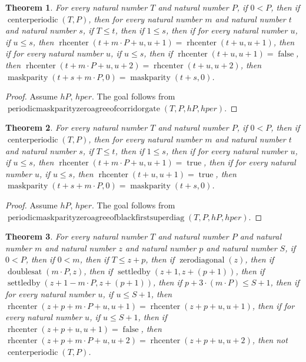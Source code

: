 \documentclass[11pt]{article}
\newtheorem{theorem}{Theorem}[section]
\theoremstyle{definition}
\begin{document}
\begin{theorem}
\label{ll:paper:periodic-maskparity-zero-agree-of-corridor-gate}
For every natural number \(T\) and natural number \(P\), if \(0 < P\), then if \(\operatorname{centerperiodic}(T, P)\), then for every natural number \(m\) and natural number \(t\) and natural number \(s\), if \(T \le t\), then if \(1 \le s\), then if for every natural number \(u\), if \(u \le s\), then \(\operatorname{rhcenter}(t + m \cdot P + u, u + 1) = \operatorname{rhcenter}(t + u, u + 1)\), then if for every natural number \(u\), if \(u \le s\), then if \(\operatorname{rhcenter}(t + u, u + 1) = \operatorname{false}\), then \(\operatorname{rhcenter}(t + m \cdot P + u, u + 2) = \operatorname{rhcenter}(t + u, u + 2)\), then \(\operatorname{maskparity}(t + s + m \cdot P, 0) = \operatorname{maskparity}(t + s, 0)\).
\end{theorem}
\begin{proof}
Assume \(hP\), \(hper\).
The goal follows from \(\operatorname{periodicmaskparityzeroagreeofcorridorgate}(T, P, hP, hper)\).
\end{proof}
\begin{theorem}
\label{ll:paper:periodic-maskparity-zero-agree-of-black-first-superdiag}
For every natural number \(T\) and natural number \(P\), if \(0 < P\), then if \(\operatorname{centerperiodic}(T, P)\), then for every natural number \(m\) and natural number \(t\) and natural number \(s\), if \(T \le t\), then if \(1 \le s\), then if for every natural number \(u\), if \(u \le s\), then \(\operatorname{rhcenter}(t + m \cdot P + u, u + 1) = \operatorname{true}\), then if for every natural number \(u\), if \(u \le s\), then \(\operatorname{rhcenter}(t + u, u + 1) = \operatorname{true}\), then \(\operatorname{maskparity}(t + s + m \cdot P, 0) = \operatorname{maskparity}(t + s, 0)\).
\end{theorem}
\begin{proof}
Assume \(hP\), \(hper\).
The goal follows from \(\operatorname{periodicmaskparityzeroagreeofblackfirstsuperdiag}(T, P, hP, hper)\).
\end{proof}
\begin{theorem}
\label{ll:paper:not-centerperiodic-of-corridor-gate-at-zero-diag}
For every natural number \(T\) and natural number \(P\) and natural number \(m\) and natural number \(z\) and natural number \(p\) and natural number \(S\), if \(0 < P\), then if \(0 < m\), then if \(T \le z + p\), then if \(\operatorname{zerodiagonal}(z)\), then if \(\operatorname{doublesat}(m \cdot P, z)\), then if \(\operatorname{settledby}(z + 1, z + (p + 1))\), then if \(\operatorname{settledby}(z + 1 - m \cdot P, z + (p + 1))\), then if \(p + 3 \cdot (m \cdot P) \le S + 1\), then if for every natural number \(u\), if \(u \le S + 1\), then \(\operatorname{rhcenter}(z + p + m \cdot P + u, u + 1) = \operatorname{rhcenter}(z + p + u, u + 1)\), then if for every natural number \(u\), if \(u \le S + 1\), then if \(\operatorname{rhcenter}(z + p + u, u + 1) = \operatorname{false}\), then \(\operatorname{rhcenter}(z + p + m \cdot P + u, u + 2) = \operatorname{rhcenter}(z + p + u, u + 2)\), then not \(\operatorname{centerperiodic}(T, P)\).
\end{theorem}
\end{document}
